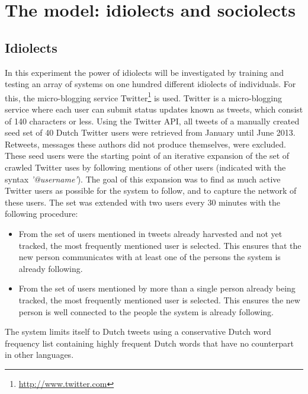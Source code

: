 \documentclass[11pt]{article}
\begin{document}
\section{The model: idiolects and sociolects} \label{model}

\subsection{Idiolects} \label{idiolects}

In this experiment the power of idiolects will be investigated by training and testing an array of systems on one hundred different idiolects of individuals. For this, the micro-blogging service Twitter\footnote{\url{http://www.twitter.com}} is used. Twitter is a micro-blogging service where each user can submit status updates known as tweets, which consist of 140 characters or less. Using the Twitter API, all tweets of a manually created seed set of 40 Dutch Twitter users were retrieved from January until June 2013. Retweets, messages these authors did not produce themselves, were excluded. These seed users were the starting point of an iterative expansion of the set of crawled Twitter uses by following mentions of other users (indicated with the syntax \emph{'@username'}). The goal of this expansion was to find as much active Twitter users as possible for the system to follow, and to capture the network of these users. The set was extended with two users every 30 minutes with the following procedure:

\begin{itemize}
\item From the set of users mentioned in tweets already harvested and not yet tracked, the most frequently mentioned user is selected. This ensures that the new person communicates with at least one of the persons the system is already following.
\item From the set of users mentioned by more than a single person already being tracked, the most frequently mentioned user is selected. This ensures the new person is well connected to the people the system is already following.
\end{itemize}

The system limits itself to Dutch tweets using a conservative Dutch word frequency list containing highly frequent Dutch words that have no counterpart in other languages.
\end{document}
